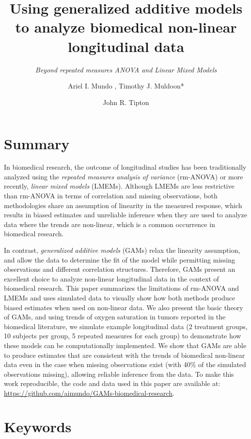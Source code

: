\documentclass[
]{article}
\author{Ariel I. Mundo \orcidaffila{}, Timothy J. Muldoon*}
\affil{Department of Biomedical Engineering, University of Arkansas, Fayetteville, AR, USA}
\affil{\normalfont {tmuldoon@uark.edu}}
\author{John R. Tipton \orcidaffilb{}}
\affil{Department of Mathematical Sciences, University of Arkansas, Fayetteville, AR, USA}
\title{\textbf{Using generalized additive models to analyze biomedical non-linear longitudinal data}}
\subtitle{\emph{Beyond repeated measures ANOVA and Linear Mixed Models}}
\date{\vspace{-2.5em}}
\begin{document}
\maketitle

\doublespacing

\hypertarget{summary}{%
\section{Summary}\label{summary}}

In biomedical research, the outcome of longitudinal studies has been traditionally analyzed using the \emph{repeated measures analysis of variance} (rm-ANOVA) or more recently, \emph{linear mixed models} (LMEMs). Although LMEMs are less restrictive than rm-ANOVA in terms of correlation and missing observations, both methodologies share an assumption of linearity in the measured response, which results in biased estimates and unreliable inference when they are used to analyze data where the trends are non-linear, which is a common occurrence in biomedical research.

In contrast, \emph{generalized additive models} (GAMs) relax the linearity assumption, and allow the data to determine the fit of the model while permitting missing observations and different correlation structures. Therefore, GAMs present an excellent choice to analyze non-linear longitudinal data in the context of biomedical research. This paper summarizes the limitations of rm-ANOVA and LMEMs and uses simulated data to visually show how both methods produce biased estimates when used on non-linear data. We also present the basic theory of GAMs, and using trends of oxygen saturation in tumors reported in the biomedical literature, we simulate example longitudinal data (2 treatment groups, 10 subjects per group, 5 repeated measures for each group) to demonstrate how these models can be computationally implemented. We show that GAMs are able to produce estimates that are consistent with the trends of biomedical non-linear data even in the case when missing observations exist (with 40\% of the simulated observations missing), allowing reliable inference from the data. To make this work reproducible, the code and data used in this paper are available at: \url{https://github.com/aimundo/GAMs-biomedical-research}.

\hypertarget{keywords}{%
\section*{Keywords}\label{keywords}}
\end{document}
